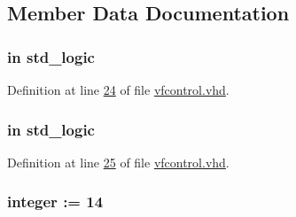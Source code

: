 \subsection{Member Data Documentation}
\hypertarget{classvfcontrol_a4a4609c199d30b3adebbeb3a01276ec5}{}
\subsubsection[{clk}]{ {\bfseries \textcolor{keywordflow}{in}\textcolor{vhdlchar}{ }} {\bfseries \textcolor{comment}{std\+\_\+logic}\textcolor{vhdlchar}{ }} \hspace{0.3cm}{\ttfamily [Port]}}\label{classvfcontrol_a4a4609c199d30b3adebbeb3a01276ec5}


Definition at line \hyperlink{vfcontrol_8vhd_source_l00024}{24} of file \hyperlink{vfcontrol_8vhd_source}{vfcontrol.\+vhd}.

\hypertarget{classvfcontrol_adcf9c6f5161d039addbda5819bee64a3}{}
\subsubsection[{en}]{ {\bfseries \textcolor{keywordflow}{in}\textcolor{vhdlchar}{ }} {\bfseries \textcolor{comment}{std\+\_\+logic}\textcolor{vhdlchar}{ }} \hspace{0.3cm}{\ttfamily [Port]}}\label{classvfcontrol_adcf9c6f5161d039addbda5819bee64a3}


Definition at line \hyperlink{vfcontrol_8vhd_source_l00025}{25} of file \hyperlink{vfcontrol_8vhd_source}{vfcontrol.\+vhd}.

\hypertarget{classvfcontrol_aac2d6825f96b21ae984648cc93554339}{}
\subsubsection[{F}]{ {\bfseries \textcolor{vhdlchar}{ }} {\bfseries \textcolor{comment}{integer}\textcolor{vhdlchar}{ }\textcolor{vhdlchar}{ }\textcolor{vhdlchar}{\+:}\textcolor{vhdlchar}{=}\textcolor{vhdlchar}{ }\textcolor{vhdlchar}{ } \textcolor{vhdldigit}{14} \textcolor{vhdlchar}{ }} \hspace{0.3cm}{\ttfamily [Generic]}}\label{classvfcontrol_aac2d6825f96b21ae984648cc93554339}


